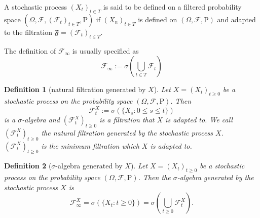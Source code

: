 \documentclass{report}
\newtheorem{definition}{Definition}[section]
\theoremstyle{nonumberplain}
\begin{document}
A stochastic process $(X_{t})_{t\in T }$ is said to be defined on a filtered probability space $(\Omega,\mathcal{F},(\mathcal{F}_{t})_{t\in T },\mathrm{P})$ if $(X_{n})_{t\in T }$ is defined on $(\Omega,\mathcal{F},\mathrm{P})$ and adapted to the filtration $\mathfrak{F} =(\mathcal{F}_{t})_{t\in T }$. 

The definition of $\mathcal{F}_{\infty}$ is usually specified as
\[
\mathcal{F}_{\infty}:=\sigma\left(\bigcup_{t\in T} \mathcal{F}_t\right)
\]

\begin{definition}[natural filtration generated by $X$]
	Let $X=(X_{t})_{t\ge 0}$ be a stochastic process on the probability space $(\Omega,\mathcal{F},\mathrm{P})$. Then 
	\[
	{\mathcal {F}}_{t}^X:=\sigma (\{X_{s}:0\le s\le t\})
	\]
	is a $\sigma$-algebra and $(\mathcal {F}_{t}^X)_{t\ge0} $ is a filtration that $X$ is adapted to. We call $(\mathcal {F}_{t}^X)_{t\ge0} $ the \emph{natural filtration generated by the stochastic process $X$}. $(\mathcal {F}_{t}^X)_{t\ge0} $ is the minimum filtration which $X$ is adapted to.
\end{definition}

\begin{definition}[$\sigma$-algebra generated by $X$]
	Let $X=(X_{t})_{t\ge 0}$ be a stochastic process on the probability space $(\Omega,\mathcal{F},\mathrm{P})$. Then the \emph{$\sigma$-algebra generated by the stochastic process $X$} is
	\[
	{\mathcal {F}}_{\infty}^X=\sigma (\{X_{t}:t\ge 0\})=\sigma\left(\bigcup_{t\ge 0} \mathcal{F}^X_t\right).
	\]
\end{definition}
\end{document}
